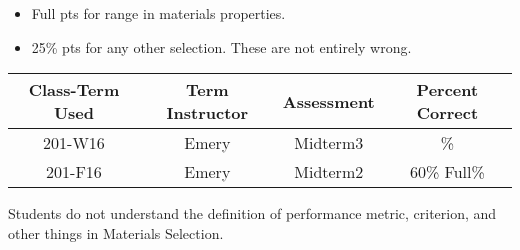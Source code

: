 \begin{rubric}

\begin{itemize}
	\item Full pts for range in materials properties. 
	\item 25\% pts for any other selection. These are not entirely wrong.
\end{itemize}

\end{rubric}

\begin{outcomes}
	\begin{center}
		\begin{tabular}{cccc}
		\hline\hline
			Class-Term Used & Term Instructor & Assessment & Percent Correct\\
			\hline
			201-W16 & Emery & Midterm3 & \%\\    %
			201-F16 & Emery & Midterm2 & 60\% Full\%\\    %
			\hline
		\end{tabular}
	\end{center}
\end{outcomes}

\begin{comments}

Students do not understand the definition of performance metric, criterion, and other things in Materials Selection.
	
\end{comments}